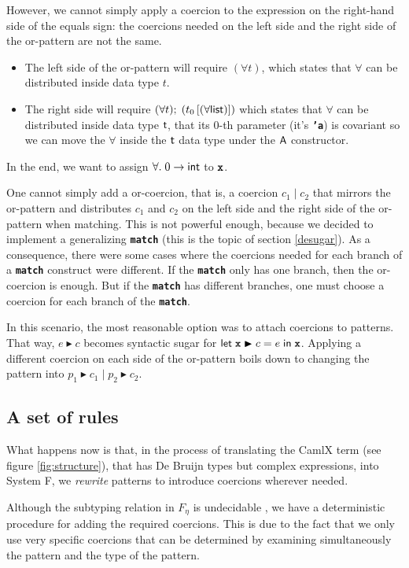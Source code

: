 \documentclass[10pt,a4paper,twoside,titlepage,twocolumn]{article}
\newcommand{\code}[1]{\textbf{\texttt{#1}}}
\begin{document}
However, we cannot simply apply a coercion to the expression on the right-hand
side of the equals sign: the coercions needed on the left side and the right
side of the or-pattern are not the same.
\begin{itemize}
  \item The left side of the or-pattern will require $(\forall t)$, which states
    that $\forall$ can be distributed inside data type $t$.
  \item The right side will require
    $(\forall t);\;(t_0\left[ (\forall \text{\textsf{list}}) \right])$
    which states
    that $\forall$ can be distributed inside data type $\text{\textsf{t}}$, that its
    $0$-th parameter (it's \code{'a}) is covariant so we can move the $\forall$
    inside the $\text{\textsf{t}}$ data type under the $\text{\textsf{A}}$ constructor.
\end{itemize}
In the end, we want to assign $\forall.\;0\to\text{\textsf{int}}$ to $\evid$.

One cannot simply add a or-coercion, that is, a coercion $c_1\;|\;c_2$ that
mirrors the or-pattern and distributes $c_1$ and $c_2$ on the left side and the
right side of the or-pattern when matching. This is not powerful enough, because
we decided to implement a generalizing \code{match} (this is the topic of
section \vref{desugar}). As a consequence, there were some cases where the
coercions needed for each branch of a \code{match} construct were different. If
the \code{match} only has one branch, then the or-coercion is enough. But if the
\code{match} has different branches, one must choose a coercion for each branch
of the \code{match}.

In this scenario, the most reasonable option was to attach coercions to
patterns. That way, $e \blacktriangleright c$ becomes syntactic sugar for
$\kwd{let}\; \evid \blacktriangleright c = e\;\kwd{in}\; \evid$. Applying a
different coercion on each side of the or-pattern boils down to changing the
pattern into $p_1 \blacktriangleright c_1\;|\; p_2 \blacktriangleright c_2$.

\subsection{A set of rules}

What happens now is that, in the process of translating the CamlX term
(see figure \vref{fig:structure}), that has De Bruijn types but complex
expressions, into System F, we \emph{rewrite} patterns to introduce coercions
wherever needed.

Although the subtyping relation in $F_\eta$ is undecidable \cite{mitchell-88},
we have a deterministic procedure for adding the required coercions. This is due
to the fact that we only use very specific coercions that can be determined by
examining simultaneously the pattern and the type of the pattern.
\end{document}
